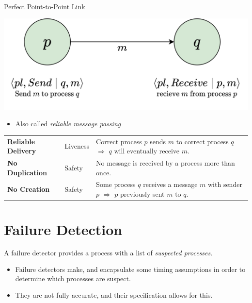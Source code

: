 \begin{definitionbox}{Perfect Point-to-Point Link}
    \begin{center}
        \includegraphics[width=.6\textwidth]{reliable_broadcast/images/perfect_links.drawio.png}
    \end{center}
    \begin{itemize}
        \item Also called \textit{reliable message passing}
    \end{itemize}
    \begin{center}
        \begin{tabular}{l l p{}}
            \textbf{Reliable Delivery} & Liveness & Correct process $p$ sends $m$ to correct process $q$ $\Rightarrow$ $q$ will eventually receive $m$. \\
            \textbf{No Duplication} & Safety & No message is received by a process more than once. \\
            \textbf{No Creation} & Safety & Some process $q$ receives a message $m$ with sender $p$ $\Rightarrow$ $p$ previously sent $m$ to $q$. \\
        \end{tabular}
    \end{center}
\end{definitionbox}

\section{Failure Detection}
A failure detector provides a process with a list of \textit{suspected processes}.
\begin{itemize}
  \item Failure detectors make, and encapsulate some timing assumptions in order to determine which processes are suspect.
  \item They are not fully accurate, and their specification allows for this.
\end{itemize}

